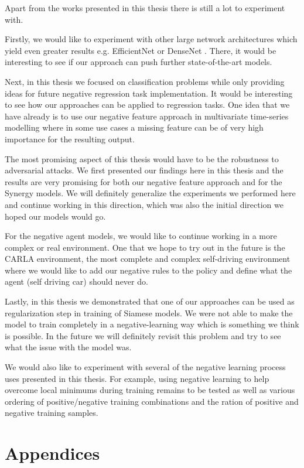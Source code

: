 \documentclass[b5paper]{book}
\let\cite\parencite
\begin{document}
Apart from the works presented in this thesis there is still a lot to experiment with. 

Firstly, we would like to experiment with other large network architectures which yield even greater results e.g. EfficientNet \cite{tan2019efficientnet} or DenseNet \cite{huang2017densely}. There, it would be interesting to see if our approach can push further state-of-the-art models.

Next, in this thesis we focused on classification problems while only providing ideas for future negative regression task implementation. It would be interesting to see how our approaches can be applied to regression tasks. One idea that we have already is to use our negative feature approach in multivariate time-series modelling where in some use cases a missing feature can be of very high importance for the resulting output.

The most promising aspect of this thesis would have to be the robustness to adversarial attacks. We first presented our findings here in this thesis and the results are very promising for both our negative feature approach and for the Synergy models. We will definitely generalize the experiments we performed here and continue working in this direction, which was also the initial direction we hoped our models would go.

For the negative agent models, we would like to continue working in a more complex or real environment. One that we hope to try out in the future is the CARLA \cite{dosovitskiy2017carla} environment, the most complete and complex self-driving environment where we would like to add our negative rules to the policy and define what the agent (self driving car) should never do.

Lastly, in this thesis we demonstrated that one of our approaches can be used as regularization step in training of Siamese models. We were not able to make the model to train completely in a negative-learning way which is something we think is possible. In the future we will definitely revisit this problem and try to see what the issue with the model was.

We would also like to experiment with several of the negative learning process uses presented in this thesis. For example, using negative learning to help overcome local minimums during training remains to be tested as well as various ordering of positive/negative training combinations and the ration of positive and negative training samples.

\part{Appendices}
\end{document}
